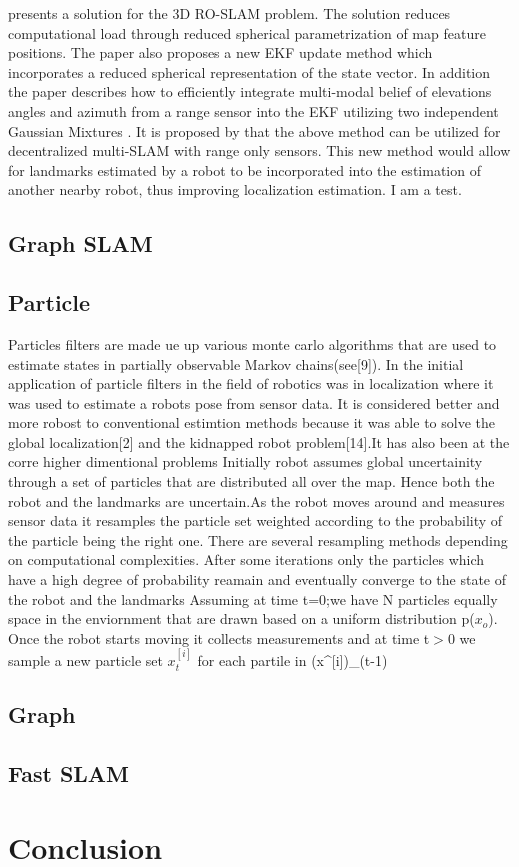\documentclass[conference]{IEEEtran}
\begin{document}
\cite{Fabresse2013} presents a solution for the 3D RO-SLAM problem. The solution reduces computational load through reduced spherical parametrization of map feature positions. The paper also proposes a new EKF update method which incorporates a reduced spherical representation of the state vector. In addition the paper describes how to efficiently integrate multi-modal belief of elevations angles and azimuth from a range sensor into the EKF utilizing two independent Gaussian Mixtures \cite{Fabresse2013}. It is proposed by \cite{Fabresse2015} that the above method can be utilized for decentralized multi-SLAM with range only sensors. This new method would allow for landmarks estimated by a robot to be incorporated into the estimation of another nearby robot, thus improving localization estimation. 
I am a test. 





\subsection{Graph SLAM}
\subsection{Particle}
Particles filters are made ue up various monte carlo algorithms that are used to estimate states in partially observable Markov chains(see[9]). In the initial application of particle filters in the field of robotics was in localization where it was used to estimate a robots pose from sensor data. It is considered better and more robost to conventional estimtion methods because it was able to solve the global localization[2] and the kidnapped robot problem[14].It has also been at the corre higher dimentional problems  
Initially robot assumes global uncertainity through a set of particles that are distributed all over the map. Hence both the robot and the landmarks are uncertain.As the robot moves around and measures sensor data it resamples the particle set weighted according to the probability of the particle being the right one. There are several resampling methods depending on computational complexities. After some iterations only the particles which have a high degree of probability  reamain and eventually converge to the state of the robot and the landmarks
Assuming at time t=0;we have N particles equally space in the enviornment that are drawn based on a uniform distribution p($x_o$).
Once the robot starts moving it collects measurements and at time t$>$0 we sample a new particle set $x^[i]_t$ for each partile in (x^[i])_(t-1)

\subsection{Graph}
\subsection{Fast SLAM}



  

\section{Conclusion}


	
	
	
\end{document}
